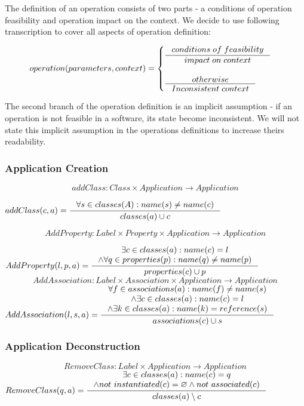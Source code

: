 \documentclass[11pt]{article}
\begin{document}
The definition of an operation consists of two parts - a conditions of operation feasibility and operation impact on the context. We decide to use following transcription to cover all aspects  of operation definition:

\begin{equation*}
\begin{gathered}
operation(parameters, context) = \begin{cases}
  \inference{conditions \; of \; feasibility}{impact \; on \; context}\\ \\
  \inference{otherwise}{Inconsistent \; context}
 \end{cases}
\end{gathered}
\end{equation*}

The second branch of the operation definition is an implicit assumption - if an operation is not feasible in a software, its state become inconsistent. We will not state this implicit assumption in the operations definitions to increase theirs readability.


\subsubsection{Application Creation}
$$addClass: Class \times Application \rightarrow Application $$

$
addClass(c, a) = \inference{\forall s \in classes(A) : name(s) \neq name(c)}
{classes(a) \cup c}
$

$$AddProperty : Label \times Property \times Application \rightarrow Application $$

$
AddProperty(l, p, a) = \inference{\exists c \in classes(a) : name(c) = l \\ \wedge \forall q \in  properties(p) : name(q) \neq name(p)}{properties(c) \cup p }
$
$$AddAssociation : Label \times Association \times Application \rightarrow Application $$
$
AddAssociation(l, s, a) = \inference{\forall f \in associations(a) : name(f) \neq name(s) \\ \wedge \exists c \in classes(a) : name(c) = l \\ \wedge \exists k \in classes(a) : name(k) = reference(s) }{associations(c) \cup s}
$

\subsubsection{Application Deconstruction}
$$RemoveClass: Label \times Application \rightarrow Application $$
$
RemoveClass(q, a) = \inference{\exists c \in classes(a) : name(c) = q \\
\wedge not$ $instantiated(c) = \varnothing \wedge not$ $associated(c)}{classes(a) \setminus c }
$
\end{document}
